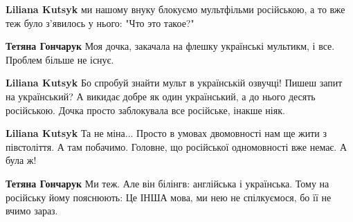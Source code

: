 \begin{itemize}
\begin{itemize}
 
\textbf{Liliana Kutsyk} ми нашому внуку блокуємо мультфільми російською, а то вже теж було з'явилось у нього: "Что это такое?"

 
\textbf{Тетяна Гончарук} Моя дочка, закачала на флешку українські мультикм, і все. Проблем більше не існує.

 
\textbf{Liliana Kutsyk} Бо спробуй знайти мульт в українській озвучці! Пишеш запит на український? А викидає добре як один український, а до нього десять російською. Дочка просто заблокувала все російське, інакше ніяк.

 
\textbf{Liliana Kutsyk} Та не міна... Просто в умовах двомовності нам ще жити з
півстоліття. А там побачимо. Головне, що російської одномовності вже немає. А
була ж!

 
\textbf{Тетяна Гончарук} Ми теж. Але він білінгв: англійська і українська. Тому на російську йому пояснюють: Це ІНША мова, ми нею не спілкуємося, бо її не вчимо зараз.

 

\end{itemize}
\end{itemize}

